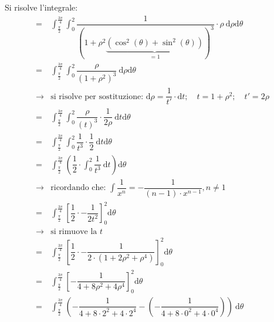 \documentclass[a4paper]{article}
\begin{document}
	\noindent
	Si risolve l'integrale:
	\begin{equation*}
		\begin{array}{cl}
			=& \displaystyle\int_{\frac{\pi}{2}}^{\frac{3\pi}{4}} \int_{0}^{2} \dfrac{1}{(1+ \rho^{2} \underbrace{\left(\cos^{2}\left(\theta\right) + \sin^{2}\left(\theta\right)\right)}_{=1})^{3}} \cdot \rho \: \mathrm{d}\rho\mathrm{d}\theta \\[1em]
			=& \displaystyle\int_{\frac{\pi}{2}}^{\frac{3\pi}{4}} \int_{0}^{2} \dfrac{\rho}{\left(1 + \rho^{2}\right)^{3}} \: \mathrm{d}\rho\mathrm{d}\theta \\ [1.5em]
			\rightarrow& \text{si risolve per sostituzione: }\mathrm{d}\rho = \dfrac{1}{t'} \cdot \mathrm{d}t; \hspace{1em} t = 1+\rho^{2}; \hspace{1em} t'=2\rho \\ [.7em]
			=& \displaystyle\int_{\frac{\pi}{2}}^{\frac{3\pi}{4}} \int_{0}^{2} \dfrac{\rho}{\left(t\right)^{3}} \cdot \dfrac{1}{2\rho} \: \mathrm{d}t\mathrm{d}\theta \\ [1.5em]
			=& \displaystyle\int_{\frac{\pi}{2}}^{\frac{3\pi}{4}} \int_{0}^{2} \dfrac{1}{t^{3}} \cdot \dfrac{1}{2} \: \mathrm{d}t\mathrm{d}\theta \\ [1.5em]
			=& \displaystyle\int_{\frac{\pi}{2}}^{\frac{3\pi}{4}} \left( \dfrac{1}{2} \cdot \int_{0}^{2} \dfrac{1}{t^{3}} \: \mathrm{d}t \right) \mathrm{d}\theta \\ [1.5em]
			\rightarrow& \text{ricordando che: } \displaystyle\int\dfrac{1}{x^{n}} = -\dfrac{1}{\left(n-1\right) \cdot x^{n-1}}, n \ne 1 \\ [.7em]
			=& \displaystyle\int_{\frac{\pi}{2}}^{\frac{3\pi}{4}} \left[\dfrac{1}{2} \cdot - \dfrac{1}{2t^2}\right]_{0}^{2} \mathrm{d}\theta \\ [1.5em]
			\rightarrow& \text{si rimuove la }t \\ [.7em]
			=& \displaystyle\int_{\frac{\pi}{2}}^{\frac{3\pi}{4}} \left[\dfrac{1}{2} \cdot - \dfrac{1}{2 \cdot \left(1 + 2\rho^{2} + \rho^{4}\right)}\right]_{0}^{2} \mathrm{d}\theta \\ [1.5em]
			=& \displaystyle\int_{\frac{\pi}{2}}^{\frac{3\pi}{4}} \left[- \dfrac{1}{4+8\rho^{2}+4\rho^{4}}\right]_{0}^{2} \mathrm{d}\theta \\ [1.5em]
			=& \displaystyle\int_{\frac{\pi}{2}}^{\frac{3\pi}{4}} \left(-\dfrac{1}{4 + 8 \cdot 2^{2} + 4 \cdot 2^{4}} - \left(-\dfrac{1}{4 + 8 \cdot 0^{2} + 4 \cdot 0^{4}}\right)\right) \: \mathrm{d}\theta \\ [1.5em]

\end{array}
\end{equation*}
\end{document}
